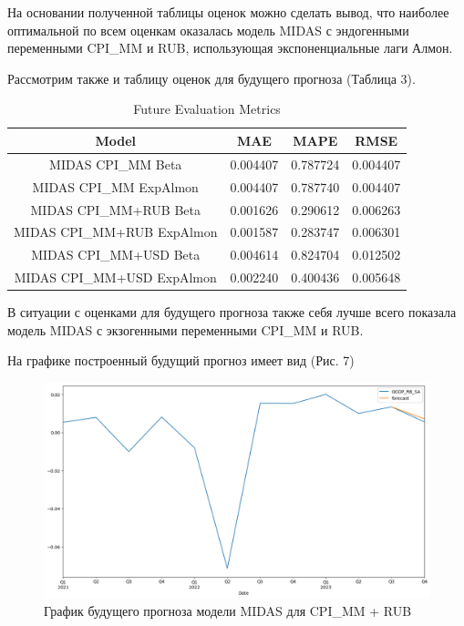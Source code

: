 \documentclass[a4paper, 12pt]{extarticle}
\numberwithin{equation}{subsection}
\begin{document}
	На основании полученной таблицы оценок можно сделать вывод, что наиболее оптимальной по всем оценкам оказалась модель MIDAS с эндогенными переменными CPI\_MM и RUB, использующая экспоненциальные лаги Алмон.
	
	Рассмотрим также и таблицу оценок для будущего прогноза (Таблица 3).
	
	\begin{table}[htbp]
		\centering
		\caption{Future Evaluation Metrics}
		\label{tab:evaluation_metrics}
		\begin{tabular}{|c|c|c|c|}
			\hline
			Model & MAE & MAPE & RMSE \\
			\hline
			MIDAS CPI\_MM Beta          & 0.004407 & 0.787724 & 0.004407 \\
			MIDAS CPI\_MM ExpAlmon      & 0.004407 & 0.787740 & 0.004407 \\
			MIDAS CPI\_MM+RUB Beta      & 0.001626 & 0.290612 & 0.006263 \\
			MIDAS CPI\_MM+RUB ExpAlmon  & 0.001587 & 0.283747 & 0.006301 \\
			MIDAS CPI\_MM+USD Beta      & 0.004614 & 0.824704 & 0.012502 \\
			MIDAS CPI\_MM+USD ExpAlmon  & 0.002240 & 0.400436 & 0.005648 \\
			\hline
		\end{tabular}
	\end{table}
	
	В ситуации с оценками для будущего прогноза также себя лучше всего показала модель MIDAS с экзогенными переменными CPI\_MM и RUB.
	
	На графике построенный будущий прогноз имеет вид (Рис. 7)
	\begin{figure}[h]
		\centering
		\includegraphics[scale=0.5]{images/img07}
		\caption{График будущего прогноза модели MIDAS для CPI\_MM + RUB}
		\label{fig:img07}
	\end{figure}
	
\end{document}
